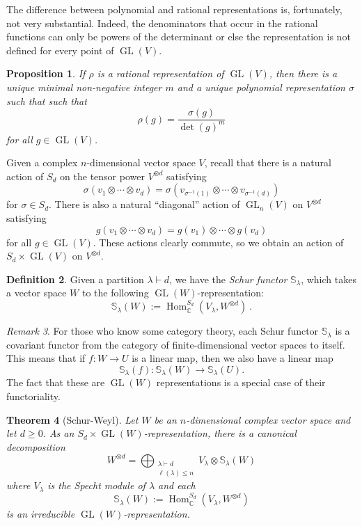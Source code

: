 \documentclass[12pt]{article}
\theoremstyle{plain}
\newtheorem{theorem}{Theorem}[section]
\newtheorem{proposition}[theorem]{Proposition}
\theoremstyle{definition}
\newtheorem{definition}[theorem]{Definition}
\theoremstyle{remark}
\newtheorem{remark}[theorem]{Remark}
\numberwithin{equation}{section}
\begin{document}
The difference between polynomial and rational representations is,
fortunately, not very substantial.  Indeed, the denominators that occur
in the rational functions can only be powers of the determinant or else
the representation is not defined for every point of
$\operatorname{GL}(V)$.

\begin{proposition}
If $\rho$ is a rational representation of $\operatorname{GL}(V)$,
then there is a unique minimal non-negative integer $m$
and a unique polynomial representation $\sigma$
such that
such that
\[
\rho(g) = \frac{\sigma(g)}{\det(g)^m}
\]
for all $g \in \operatorname{GL}(V)$. 
\end{proposition}

Given a complex $n$-dimensional vector space $V$,
recall that there is a natural action of $S_d$ on the tensor power
$V^{\otimes d}$ satisfying
\[
\sigma(v_1 \otimes \cdots \otimes v_d) =
\sigma(v_{\sigma^{-1}(1)} \otimes \cdots \otimes v_{\sigma^{-1}(d)})
\]
for $\sigma \in S_d$.
There is also a natural ``diagonal'' action of $\operatorname{GL}_n(V)$
on $V^{\otimes d}$ satisfying
\[
g(v_1 \otimes \cdots \otimes v_d) = g(v_1) \otimes \cdots \otimes g(v_d)
\]
for all $g \in \operatorname{GL}(V)$.
These actions clearly commute, so we obtain an action of
$S_d \times \operatorname{GL}(V)$ on $V^{\otimes d}$.

\begin{definition}
Given a partition $\lambda \vdash d$, we
have the \emph{Schur functor} $\mathbb{S}_\lambda$,
which takes a vector space $W$ to the following
$\operatorname{GL}(W)$-representation:
\[
\mathbb{S}_\lambda(W) :=
\operatorname{Hom}^{S_d}_{\mathbb{C}}(V_\lambda,W^{\otimes d}) \ .
\]
\end{definition}

\begin{remark}
For those who know some category theory,
each Schur functor $\mathbb{S}_\lambda$ is a covariant functor
from the category of finite-dimensional vector spaces to itself.
This means that if $f : W \to U$ is a linear map,
then we also have a linear map
\[
\mathbb{S}_\lambda(f) : \mathbb{S}_\lambda(W) \to \mathbb{S}_\lambda(U).
\]
The fact that these are $\operatorname{GL}(W)$ representations is a
special case of their functoriality.
\end{remark}

\begin{theorem}[Schur-Weyl]
Let $W$ be an $n$-dimensional complex vector space
and let $d \ge 0$.
As an $S_d \times \operatorname{GL}(W)$-representation, there is a
canonical decomposition
\[
W^{\otimes d} =
\bigoplus_{\substack{\lambda \vdash d\\ \ell(\lambda) \le n}}
V_\lambda \otimes \mathbb{S}_\lambda(W)
\]
where $V_\lambda$ is the Specht module of $\lambda$ and each
\[
\mathbb{S}_\lambda(W) :=
\operatorname{Hom}^{S_d}_{\mathbb{C}}(V_\lambda,W^{\otimes d})
\]
is an irreducible $\operatorname{GL}(W)$-representation.
\end{theorem}
\end{document}
